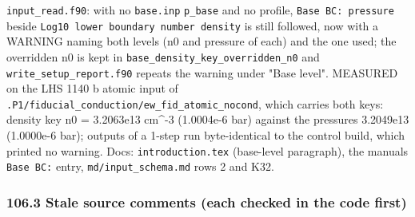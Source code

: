 \documentclass[english,a4paper]{my_memo}
\begin{document}
\texttt{input\_read.f90}: with no \texttt{base.inp} \texttt{p\_base} and no profile, \texttt{Base\ BC:\ pressure} beside \texttt{Log10\ lower\ boundary\ number\ density} is still followed,
now with a WARNING naming both levels (n0 and pressure of each) and the one
used; the overridden n0 is kept in \texttt{base\_density\_key\_overridden\_n0} and
\texttt{write\_setup\_report.f90} repeats the warning under "Base level". MEASURED on
the LHS 1140 b atomic input of \texttt{.P1/fiducial\_conduction/ew\_fid\_atomic\_nocond},
which carries both keys: density key n0 = 3.2063e13 cm\^{}-3 (1.0004e-6 bar)
against the pressure\textquotesingle s 3.2049e13 (1.0000e-6 bar); outputs of a 1-step run
byte-identical to the control build, which printed no warning. Docs:
\texttt{introduction.tex} (base-level paragraph), the manual\textquotesingle s \texttt{Base\ BC:} entry,
\texttt{md/input\_schema.md} rows 2 and K32.

\subsubsection{106.3 Stale source comments (each checked in the code first)}\label{1063-stale-source-comments-each-checked-in-the-code-first}
\end{document}
